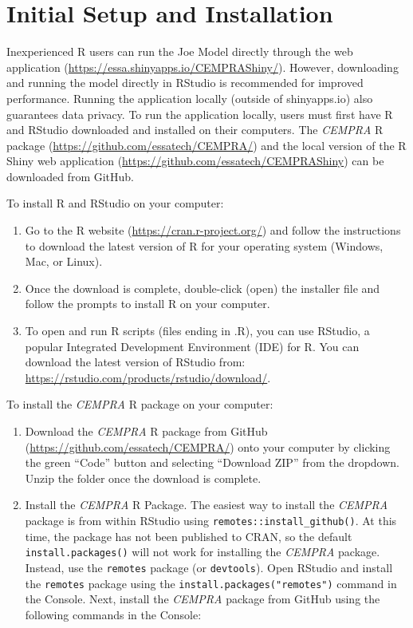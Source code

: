 \documentclass[
  letterpaper,
  DIV=11,
  numbers=noendperiod]{scrreprt}
\providecommand{\tightlist}{%
  \setlength{\itemsep}{0pt}\setlength{\parskip}{0pt}}\usepackage{longtable,booktabs,array}
\begin{document}
\hypertarget{initial-setup-and-installation}{%
\section{Initial Setup and
Installation}\label{initial-setup-and-installation}}

Inexperienced R users can run the Joe Model directly through the web
application (\url{https://essa.shinyapps.io/CEMPRAShiny/}). However,
downloading and running the model directly in RStudio is recommended for
improved performance. Running the application locally (outside of
shinyapps.io) also guarantees data privacy. To run the application
locally, users must first have R and RStudio downloaded and installed on
their computers. The \emph{CEMPRA} R package
(\url{https://github.com/essatech/CEMPRA/}) and the local version of the
R Shiny web application (\url{https://github.com/essatech/CEMPRAShiny})
can be downloaded from GitHub.

To install R and RStudio on your computer:

\begin{enumerate}
\def\labelenumi{\arabic{enumi}.}
\tightlist
\item
  Go to the R website (\url{https://cran.r-project.org/}) and follow the
  instructions to download the latest version of R for your operating
  system (Windows, Mac, or Linux).
\item
  Once the download is complete, double-click (open) the installer file
  and follow the prompts to install R on your computer.
\item
  To open and run R scripts (files ending in .R), you can use RStudio, a
  popular Integrated Development Environment (IDE) for R. You can
  download the latest version of RStudio from:
  \url{https://rstudio.com/products/rstudio/download/}.
\end{enumerate}

To install the \emph{CEMPRA} R package on your computer:

\begin{enumerate}
\def\labelenumi{\arabic{enumi}.}
\tightlist
\item
  Download the \emph{CEMPRA} R package from GitHub
  (\url{https://github.com/essatech/CEMPRA/}) onto your computer by
  clicking the green ``Code'' button and selecting ``Download ZIP'' from
  the dropdown. Unzip the folder once the download is complete.
\item
  Install the \emph{CEMPRA} R Package. The easiest way to install the
  \emph{CEMPRA} package is from within RStudio using
  \texttt{remotes::install\_github()}. At this time, the package has not
  been published to CRAN, so the default \texttt{install.packages()}
  will not work for installing the \emph{CEMPRA} package. Instead, use
  the \texttt{remotes} package (or \texttt{devtools}). Open RStudio and
  install the \texttt{remotes} package using the
  \texttt{install.packages("remotes")} command in the Console. Next,
  install the \emph{CEMPRA} package from GitHub using the following
  commands in the Console:
\end{enumerate}
\end{document}
